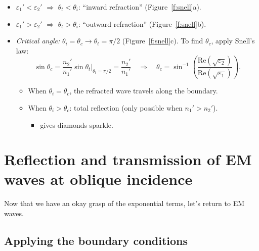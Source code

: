 \documentclass[11pt, oneside]{article}
\begin{document}
\begin{itemize}
	\item $\varepsilon_1' < \varepsilon_2'$ $\Rightarrow$ $\theta_t < \theta_i$: ``inward refraction'' (Figure~\ref{f:snell}a).
	\item $\varepsilon_1' > \varepsilon_2'$ $\Rightarrow$ $\theta_t > \theta_i$: ``outward refraction'' (Figure~\ref{f:snell}b).
	\item \emph{Critical angle:} $\theta_i = \theta_c \rightarrow \theta_t = \pi/2$ (Figure~\ref{f:snell}c). To find $\theta_c$, apply Snell's law:
	\begin{equation}
		\sin\theta_c = \frac{n_2'}{n_1'}\sin\theta_t\bigg|_{\theta_t = \pi/2} = \frac{n_2'}{n_1'}
		\quad\Rightarrow\quad
		\theta_c = \sin^{-1}\left(\frac{\mathrm{Re}\left(\sqrt{\varepsilon_2}\right)}{\mathrm{Re}\left(\sqrt{\varepsilon_1}\right)}\right).
	\end{equation}
	\begin{itemize}
		\item When $\theta_i = \theta_c$, the refracted wave travels along the boundary.
		\item When $\theta_i > \theta_c$: total reflection (only possible when $n_1' > n_2'$).
		\begin{itemize}
			\item[$\hookrightarrow$] gives diamonds sparkle.
		\end{itemize}
	\end{itemize}
\end{itemize}

\section{Reflection and transmission of EM waves at oblique incidence}

Now that we have an okay grasp of the exponential terms, let's return to EM waves.

\subsection{Applying the boundary conditions}
\end{document}
